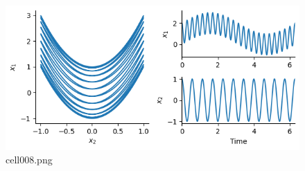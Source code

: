 \begin{figure}[ht]
	\centering
	\includegraphics[scale=0.8, max width=\linewidth]{./fig/appendix/slow-feature-analysis/cell008.png}
	\caption{cell008.png}
	\label{cell008.png}
\end{figure}